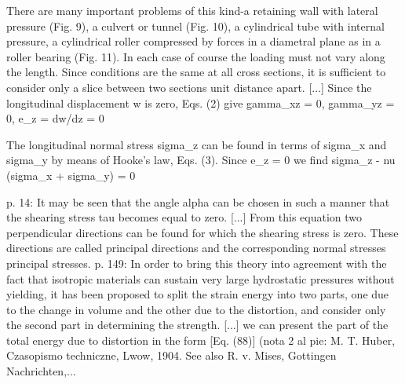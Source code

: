 \documentclass[11pt,a4paper]{article}
\newcommand{\campo}[1]{\textcolor{gris}{\footnotesize #1}}
\begin{document}
\vspace{3pt}\noindent{\small\textbf{p.\ 11-12} \quad \campo{La tension plana modela cuerpos delgados cargados en su plano, en los que la tension normal al plano es despreciable (sigma\_z = 0); la deformacion plana modela cuerpos prismaticos largos en los que la deformacion longitudinal se anula (epsilon\_z = 0); corresponde, por ejemplo, a una presa o un tubo largo donde una rebanada...}}\par
\begin{pasaje}\footnotesize There are many important problems of this kind-a retaining wall with lateral pressure (Fig. 9), a culvert or tunnel (Fig. 10), a cylindrical tube with internal pressure, a cylindrical roller compressed by forces in a diametral plane as in a roller bearing (Fig. 11). In each case of course the loading must not vary along the length. Since conditions are the same at all cross sections, it is sufficient to consider only a slice between two sections unit distance apart. [...] Since the longitudinal displacement w is zero, Eqs. (2) give gamma\_xz = 0, gamma\_yz = 0, e\_z = dw/dz = 0\end{pasaje}
\vspace{3pt}\noindent{\small\textbf{p.\ 12} \quad \campo{Ecuacion eq:principales-vm, tercera linea: sigma\_z = 0 en tension plana y sigma\_z = nu (sigma\_x + sigma\_y) en deformacion plana. tesis/capitulos/02\_marco\_teorico.tex:298-312}}\par
\begin{pasaje}\footnotesize The longitudinal normal stress sigma\_z can be found in terms of sigma\_x and sigma\_y by means of Hooke's law, Eqs. (3). Since e\_z = 0 we find sigma\_z - nu (sigma\_x + sigma\_y) = 0\end{pasaje}
\vspace{3pt}\noindent{\small\textbf{p.\ 14 (tensiones principales) y 149...} \quad \campo{A partir de las componentes cartesianas se obtienen las tensiones principales y la equivalente de von Mises, la medida escalar con que habitualmente se resume un estado tensional biaxial. tesis/capitulos/02\_marco\_teorico.tex:298}}\par
\begin{pasaje}\footnotesize p. 14: \textquotedbl{}It may be seen that the angle alpha can be chosen in such a manner that the shearing stress tau becomes equal to zero. [...] From this equation two perpendicular directions can be found for which the shearing stress is zero. These directions are called principal directions and the corresponding normal stresses principal stresses.\textquotedbl{} \textbar{} p. 149: \textquotedbl{}In order to bring this theory into agreement with the fact that isotropic materials can sustain very large hydrostatic pressures without yielding, it has been proposed to split the strain energy into two parts, one due to the change in volume and the other due to the distortion, and consider only the second part in determining the strength. [...] we can present the part of the total energy due to distortion in the form [Eq. (88)]\textquotedbl{} (nota 2 al pie: \textquotedbl{}M. T. Huber, Czasopismo techniczne, Lwow, 1904. See also R. v. Mises, Gottingen Nachrichten,...\end{pasaje}
\end{document}
